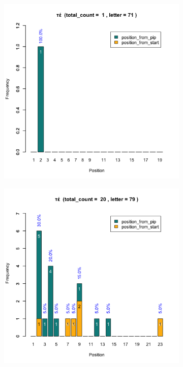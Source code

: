\documentclass[a4paper]{article}
\begin{document}
\begin{figure}
\begin{subfigure}{0.45\textwidth}
\end{subfigure}
\begin{subfigure}{0.45\textwidth}
\centering
\includegraphics[width=1\linewidth]{../../data/output/paul_R_par/plots/par9_lt71.png}
\end{subfigure}
\begin{subfigure}{0.45\textwidth}
\centering
\includegraphics[width=1\linewidth]{../../data/output/paul_R_par/plots/par9_lt79.png}
\end{subfigure}
\end{figure}
\end{document}
